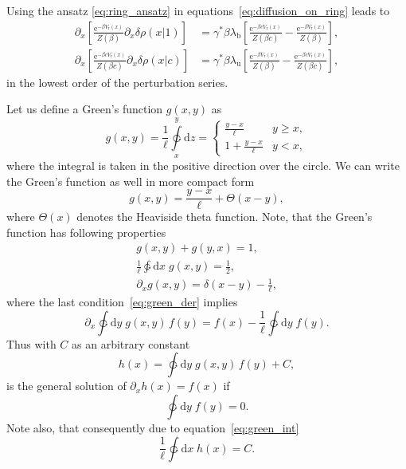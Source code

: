 \documentclass[aps,pre,twocolumn,showpacs,showkeys,superscriptaddress,floatfix]{revtex4-1}
\newcommand{\rmd}{{\mathrm d}}
\newcommand{\rme}{{\mathrm e}}
\begin{document}
Using the ansatz \eqref{eq:ring_ansatz} in equations~\eqref{eq:diffusion_on_ring} leads to 
\begin{equation}
\begin{aligned}
\partial_x \left[ \frac{ \rme^{-\beta V_\text{r}(x) } }{ Z(\beta) } \partial_x \delta \rho(x|1) \right] 
&=
\gamma^* \beta \lambda_\text{b} 
\left[ \frac{ \rme^{ - \beta c V_\text{r}(x) } }{Z(\beta c)} - \frac{ \rme^{ - \beta V_\text{r}(x) } }{ Z(\beta) } \right] , \\
\partial_x \left[ \frac{ \rme^{-\beta c V_\text{r}(x) } }{ Z(\beta c) } \partial_x \delta \rho(x|c) \right] 
&=
\gamma^* \beta \lambda_\text{u}
\left[ \frac{ \rme^{ - \beta V_\text{r}(x) } }{Z(\beta)} - \frac{ \rme^{ - \beta c V_\text{r}(x) } }{ Z(\beta c ) } \right] , 
\end{aligned}
\label{eq:diffusion_on_ring_ans}
\end{equation}
in the lowest order of the perturbation series. 

Let us define a Green's function $g(x,y)$ as \cite{Boksenbojm2012} 
\[
g(x,y) = \frac{1}{\ell} \ointctrclockwise\limits_x^y \rmd z 
= \begin{cases} 
\frac{ y - x }{\ell} & y \ge x, \\
1 + \frac{ y - x }{\ell} & y < x ,
\end{cases} 
\]
where the integral is taken in the positive direction over the circle.
We can write the Green's function as well in more compact form 
\[
g(x,y) = \frac{ y - x }{\ell} + \Theta( x - y ) ,
\] 
where $\Theta(x)$ denotes the Heaviside theta function. 
Note, that the Green's function has following properties \cite{Boksenbojm2012}
\begin{gather}
g(x,y) + g(y,x) = 1 , \label{eq:green_asym} \\ 
\frac{1}{\ell} \ointctrclockwise \rmd x \; g(x,y) = \frac{1}{2} , \label{eq:green_int} \\ 
\partial_x g(x,y) = \delta(x-y) - \frac{1}{\ell} , \label{eq:green_der} 
\end{gather}
where the last condition~\eqref{eq:green_der} implies
\[
\partial_x \ointctrclockwise \rmd y \; g(x,y) \, f(y) = f(x) - \frac{1}{\ell} \ointctrclockwise \rmd y \; f(y) . 
\]
Thus with $C$ as an arbitrary constant 
\[
h(x) = \ointctrclockwise \rmd y \; g(x,y) \, f(y) + C , 
\]
is the general solution of $ \partial_x h(x) = f(x) $ if 
\[
\ointctrclockwise \rmd y \; f(y) = 0 . 
\] 
Note also, that consequently due to equation~\eqref{eq:green_int} 
\[
\frac{1}{\ell} \ointctrclockwise \rmd x \; h(x) = C . 
\]
\end{document}
